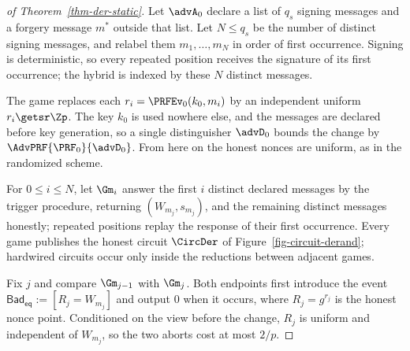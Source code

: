 \begin{proof}[of Theorem~\ref{thm-der-static}]
Let $\advA_0$ declare a list of $q_s$ signing messages and a forgery message $m^*$ outside that list. Let $N\le q_s$ be the number of distinct signing messages, and relabel them $m_1,\ldots,m_N$ in order of first occurrence. Signing is deterministic, so every repeated position receives the signature of its first occurrence; the hybrid is indexed by these $N$ distinct messages.

 The game replaces each $r_i=\PRFEv_0(k_0,m_i)$ by an independent uniform $r_i\getsr\Zp$. The key $k_0$ is used nowhere else, and the messages are declared before key generation, so a single distinguisher $\advD_0$ bounds the change by $\AdvPRF{\PRF_0}{\advD_0}$. From here on the honest nonces are uniform, as in the randomized scheme.

 For $0\le i\le N$, let $\Gm_i$ answer the first $i$ distinct declared messages by the trigger procedure, returning $(W_{m_j},s_{m_j})$, and the remaining distinct messages honestly; repeated positions replay the response of their first occurrence. Every game publishes the honest circuit $\CircDer$ of Figure~\ref{fig-circuit-derand}; hardwired circuits occur only inside the reductions between adjacent games.

Fix $j$ and compare $\Gm_{j-1}$ with $\Gm_j$. Both endpoints first introduce the event $\mathsf{Bad}_{\mathsf{eq}} := [R_j = W_{m_j}]$ and output $0$ when it occurs, where $R_j=g^{r_j}$ is the honest nonce point. Conditioned on the view before the change, $R_j$ is uniform and independent of $W_{m_j}$, so the two aborts cost at most $2/p$.


\end{proof}
